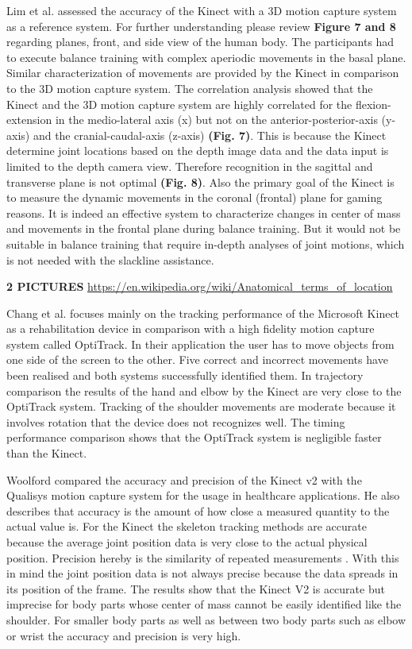 Lim et al. \cite{Lim2015-pw} assessed the accuracy of the Kinect with a 3D motion capture system as a reference system. For further understanding please review \textbf{Figure 7 and 8} regarding planes, front, and side view of the human body. The participants had to execute balance training with complex aperiodic movements in the basal plane. Similar characterization of movements are provided by the Kinect in comparison to the 3D motion capture system. The correlation analysis showed that the Kinect and the 3D motion capture system are highly correlated for the flexion-extension in the medio-lateral axis (x) but not on the anterior-posterior-axis (y-axis) and the cranial-caudal-axis (z-axis) \textbf{(Fig. 7)}. This is because the Kinect determine joint locations based on the depth image data and the data input is limited to the depth camera view. Therefore recognition in the sagittal and transverse plane is not optimal \textbf{(Fig. 8)}. Also the primary goal of the Kinect is to measure the dynamic movements in the coronal (frontal) plane for gaming reasons. It is indeed an effective system to characterize changes in center of mass and movements in the frontal plane during balance training. But it would not be suitable in balance training that require in-depth analyses of joint motions, which is not needed with the slackline assistance.

\textbf{2 PICTURES} \url{https://en.wikipedia.org/wiki/Anatomical_terms_of_location}

Chang et al. \cite{Chang2012-hz} focuses mainly on the tracking performance of the Microsoft Kinect as a rehabilitation device in comparison with a high fidelity motion capture system called OptiTrack. In their application the user has to move objects from one side of the screen to the other. Five correct and incorrect movements have been realised and both systems successfully identified them. In trajectory comparison the results of the hand and elbow by the Kinect are very close to the OptiTrack system. Tracking of the shoulder movements are moderate because it involves rotation that the device does not recognizes well. The timing performance comparison shows that the OptiTrack system is negligible faster than the Kinect.

Woolford \cite{Woolford2015-ub} compared the accuracy and precision of the Kinect v2 with the Qualisys motion capture system for the usage in healthcare applications. He also describes that accuracy is the amount of how close a measured quantity to the actual value is. For the Kinect the skeleton tracking methods are accurate because the average joint position data is very close to the actual physical position. Precision hereby is the similarity of repeated measurements \cite{Woolford2015-ub}. With this in mind the joint position data is not always precise because the data spreads in its position of the frame. The results show that the Kinect V2 is accurate but imprecise for body parts whose center of mass cannot be easily identified like the shoulder. For smaller body parts as well as between two body parts such as elbow or wrist the accuracy and precision is very high. 

